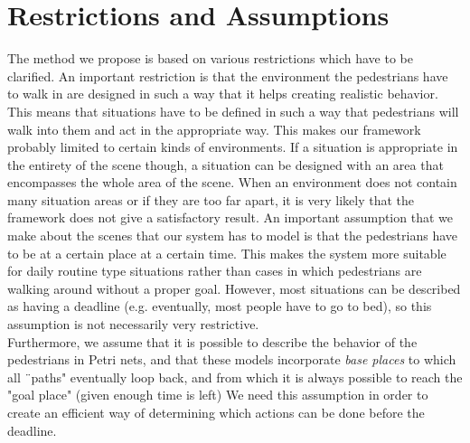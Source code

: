 \documentclass[11pt, a4paper]{book}
\begin{document}
\section{Restrictions and Assumptions}
\label{sec:restrictions}
The method we propose is based on various restrictions which have to be clarified. An important restriction is that the environment the pedestrians have to walk in are designed in such a way that it helps creating realistic behavior. This means that situations have to be defined in such a way that pedestrians will walk into them and act in the appropriate way. This makes our framework probably limited to certain kinds of environments. If a situation is appropriate in the entirety of the scene though, a situation can be designed with an area that encompasses the whole area of the scene. When an environment does not contain many situation areas or if they are too far apart, it is very likely that the framework does not give a satisfactory result.
An important assumption that we make about the scenes that our system has to model is that the pedestrians have to be at a certain place at a certain time. This makes the system more suitable for daily routine type situations rather than cases in which pedestrians are walking around without a proper goal. However, most situations can be described as having a deadline (e.g. eventually, most people have to go to bed), so this assumption is not necessarily very restrictive.\\
Furthermore, we assume that it is possible to describe the behavior of the pedestrians in Petri nets, and that these models incorporate \emph{base places} to which all ¨paths" eventually loop back, and from which it is always possible to reach the "goal place" (given enough time is left) We need this assumption in order to create an efficient way of determining which actions can be done before the deadline. \\
\end{document}

